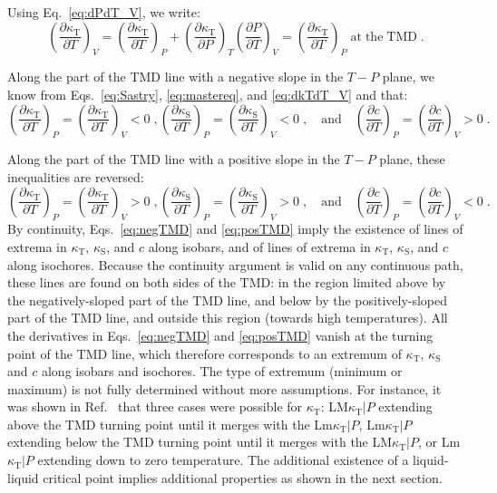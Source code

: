 \documentclass[12pt]{article}
\newcommand{\mrm}{\mathrm}
\newcommand{\kT}{\kappa_\mrm{T}}
\newcommand{\kS}{\kappa_\mrm{S}}
\begin{document}
Using Eq.~\ref{eq:dPdT_V}, we write:
\begin{equation}
\left( \frac{\partial \kT}{\partial T} \right)_V = \left( \frac{\partial \kT}{\partial T} \right)_P + \left( \frac{\partial \kT}{\partial P} \right)_T \left(\frac{\partial P}{\partial T} \right)_V = \left( \frac{\partial \kT}{\partial T} \right)_P \; \mrm{at \; the \; TMD} \; .
\label{eq:dkTdT_V}
\end{equation}

Along the part of the TMD line with a negative slope in the $T-P$ plane, we know from Eqs.~\ref{eq:Sastry}, \ref{eq:mastereq}, and \ref{eq:dkTdT_V} and that:
\begin{equation}
\left( \frac{\partial \kT}{\partial T} \right)_P = \left( \frac{\partial \kT}{\partial T} \right)_V < 0 \; , \left( \frac{\partial \kS}{\partial T} \right)_P = \left( \frac{\partial \kS}{\partial T} \right)_V < 0 \; , \quad\mrm{and}\quad \left( \frac{\partial c}{\partial T} \right)_P = \left( \frac{\partial c}{\partial T} \right)_V > 0 \; .
\label{eq:negTMD}
\end{equation}

Along the part of the TMD line with a positive slope in the $T-P$ plane, these inequalities are reversed:
\begin{equation}
\left( \frac{\partial \kT}{\partial T} \right)_P = \left( \frac{\partial \kT}{\partial T} \right)_V > 0 \; , \left( \frac{\partial \kS}{\partial T} \right)_P = \left( \frac{\partial \kS}{\partial T} \right)_V > 0 \; , \quad\mrm{and}\quad \left( \frac{\partial c}{\partial T} \right)_P = \left( \frac{\partial c}{\partial T} \right)_V < 0 \; .
\label{eq:posTMD}
\end{equation}
By continuity, Eqs.~\ref{eq:negTMD} and \ref{eq:posTMD} imply the existence of lines of extrema in $\kT$, $\kS$, and $c$ along isobars, and of lines of extrema in $\kT$, $\kS$, and $c$ along isochores. Because the continuity argument is valid on any continuous path, these lines are found on both sides of the TMD: in the region limited above by the negatively-sloped part of the TMD line, and below by the positively-sloped part of the TMD line, and outside this region (towards high temperatures). All the derivatives in Eqs.~\ref{eq:negTMD} and \ref{eq:posTMD} vanish at the turning point of the TMD line, which therefore corresponds to an extremum of $\kT$, $\kS$ and $c$ along isobars and isochores. The type of extremum (minimum or maximum) is not fully determined without more assumptions. For instance, it was shown in Ref.~\cite{Sastry_singularityfree_1996} that three cases were possible for $\kT$: LM$\kT|P$ extending above the TMD turning point until it merges with the Lm$\kT|P$, Lm$\kT|P$ extending below the TMD turning point until it merges with the LM$\kT|P$, or Lm$\kT|P$ extending down to zero temperature. The additional existence of a liquid-liquid critical point implies additional properties as shown in the next section.\\
\end{document}
